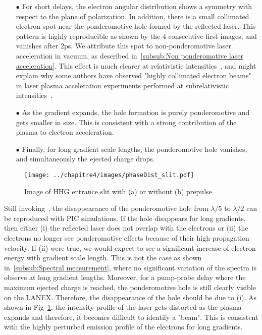 \begin{itemize}
\item[$\bullet$]  For short delays, the electron angular distribution shows a symmetry with respect to the plane of polarization. In addition, there is a small collimated electron spot near the ponderomotive hole formed by the reflected laser. This pattern is highly reproducible as shown by the 4 consecutive first images, and vanishes after $2$ps. We attribute this spot to non-ponderomotive laser acceleration in vacuum, as described in~\ref{subsub:Non ponderomotive laser acceleration}. This effect is much clearer at relativistic intensities~\cite{thevenet2015}, and might  explain why some authors have observed "highly collimated electron beams" in laser plasma acceleration experiments performed at subrelativistic intensities~\cite{bastiani1997experimental}.
\item[$\bullet$]  As the gradient expands, the hole formation is purely ponderomotive and gets smaller in size. This is consistent with a strong contribution of the plasma to electron acceleration.
\item[$\bullet$]  Finally, for long gradient scale lengths, the ponderomotive hole vanishes, and simultaneously the ejected charge drops.
\end{itemize}

\begin{figure}[H]
\centering
\texttt{[image: ../chapitre4/images/phaseDist\_slit.pdf]}\\
\caption{\label{fig:phaseDist_slit}Image of HHG entrance slit with (a) or without (b) prepulse}
\end{figure}


\noindent Still invoking~\cite{mordovanakis2009quasimonoenergetic}, the disappearance of the ponderomotive hole from $\lambda/5$ to $\lambda/2$ can be reproduced with PIC simulations. If the hole disappears for long gradients, then either (i) the reflected laser does not overlap with the electrons or (ii) the electrons no longer see ponderomotive effects because of their high propagation velocity. If (ii) were true, we would expect to see a significant increase of electron energy with gradient scale length. This is not the case as shown in~\ref{subsub:Spectral measurement}, where no significant variation of the spectra is observe at long gradient lengths. Moreover, for a pump-probe delay where the maximum ejected charge is reached, the ponderomotive hole is still clearly visible on the LANEX. Therefore, the disappearance of the hole should be due to (i). As shown in Fig~\ref{fig:phaseDist_slit}, the intensity profile of the laser gets distorted as the plasma expands and therefore, it becomes difficult to identify a "beam". This is consistent with the highly perturbed emission profile of the electrons for long gradients.




